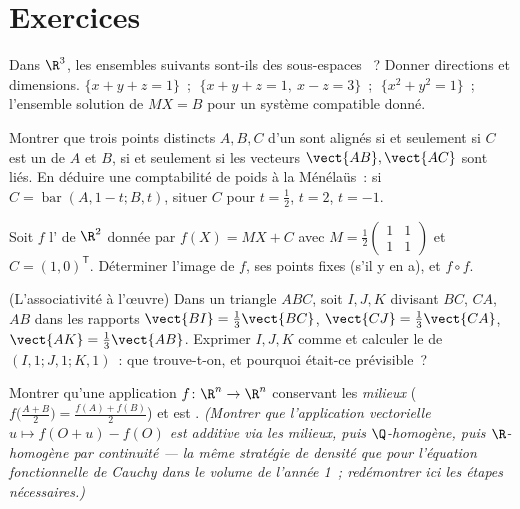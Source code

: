 \section{Exercices}

\begin{exercise}[$\star$]\label{exo:b2:affine:1}
Dans $\R^3$, les ensembles suivants sont-ils des sous-espaces ~?
Donner directions et dimensions. $\{x + y + z = 1\}$~; $\;\{x + y + z =
1,\ x - z = 3\}$~; $\;\{x^2 + y^2 = 1\}$~; l'ensemble solution de $MX =
B$ pour un système compatible donné.
\end{exercise}

\begin{exercise}[$\star$]\label{exo:b2:affine:2}
Montrer que trois points distincts $A, B, C$ d'un  sont
alignés si et seulement si $C$ est un  de $A$ et $B$, si et
seulement si les vecteurs $\vect{AB}, \vect{AC}$ sont liés. En déduire
une comptabilité de poids à la Ménélaüs~: si $C =
\operatorname{bar}(A, 1 - t; B, t)$, situer
$C$ pour $t = \frac12$, $t = 2$, $t = -1$.
\end{exercise}

\begin{exercise}[$\star$]\label{exo:b2:affine:3}
Soit $f$ l' de $\R^2$ donnée par $f(X) = MX + C$ avec
$M = \frac12\begin{pmatrix} 1 & 1\\ 1 & 1\end{pmatrix}$ et $C =
(1, 0)^{\mathsf T}$. Déterminer l'image de $f$, ses points fixes
(s'il y en a), et $f \circ f$.
\end{exercise}

\begin{exercise}[$\star\star$]\label{exo:b2:affine:4}
(L'associativité à l'œuvre) Dans un triangle $ABC$, soit $I, J, K$
divisant $BC$, $CA$, $AB$ dans les rapports $\vect{BI} =
\frac13\vect{BC}$, $\vect{CJ} = \frac13\vect{CA}$, $\vect{AK} =
\frac13\vect{AB}$. Exprimer $I, J, K$ comme  et calculer le
 de $(I,1;J,1;K,1)$~: que trouve-t-on, et pourquoi
était-ce prévisible~?
\end{exercise}

\begin{exercise}[$\star\star$]\label{exo:b2:affine:5}
Montrer qu'une application $f \colon \R^n \to \R^n$ conservant les
\emph{milieux} ($f\bigl(\frac{A+B}{2}\bigr) = \frac{f(A) + f(B)}{2}$)
et \emph{} est . \emph{(Montrer que l'application
vectorielle $u \mapsto f(O + u) - f(O)$ est additive via les milieux,
puis $\Q$-homogène, puis $\R$-homogène par continuité ---
la même stratégie de densité que pour l'équation fonctionnelle de
Cauchy dans le volume de l'année 1~; redémontrer ici les étapes
nécessaires.)}
\end{exercise}

